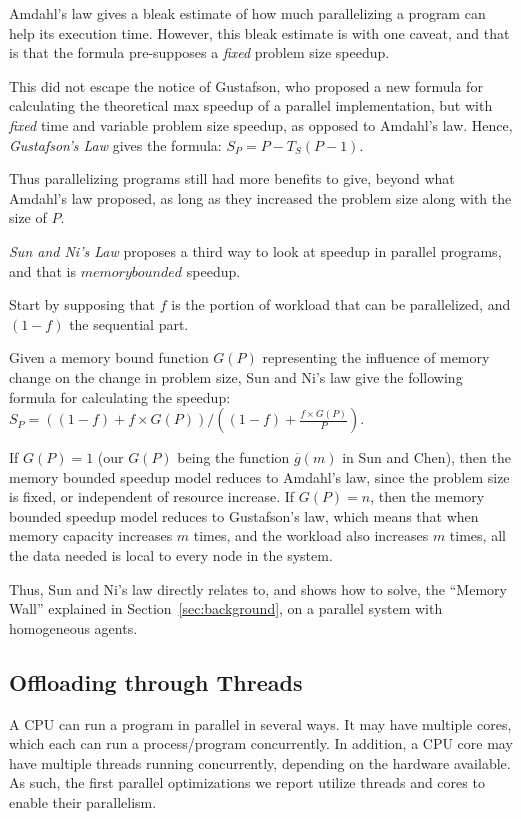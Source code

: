 Amdahl's law gives a bleak estimate of how much parallelizing a program can help its execution time.
However, this bleak estimate is with one caveat, and that is that the formula pre-supposes a \textit{fixed} problem size speedup.

This did not escape the notice of Gustafson\cite{Gustafson:1988:RAL:42411.42415}, who proposed a new formula for calculating the theoretical max speedup of a parallel implementation, but with \textit{fixed} time and variable problem size speedup, as opposed to Amdahl's law.
Hence, \textit{Gustafson's Law} gives the formula: $S_P = P - T_S(P-1)$.

Thus parallelizing programs still had more benefits to give, beyond what Amdahl's law proposed, as long as they increased the problem size along with the size of $P$.

\textit{Sun and Ni's Law}\cite{Sun:1990:VPS:110382.110450,Sun2010183} proposes a third way to look at speedup in parallel programs, and that is $memory bounded$ speedup.

Start by supposing that $f$ is the portion of workload that can be parallelized, and $(1-f)$ the sequential part.

Given a memory bound function $G(P)$ representing the influence of memory change on the change in problem size, Sun and Ni's law give the following formula for calculating the speedup: $S_P = ((1-f)+f\times G(P))/((1-f)+\frac{f\times G(P)}{P})$.

If $G(P)=1$ (our $G(P)$ being the function $\overline{g}(m)$ in Sun and Chen\cite{Sun2010183}), then the memory bounded speedup model reduces to Amdahl's law, since the problem size is fixed, or independent of resource increase.
If $G(P)=n$, then the memory bounded speedup model reduces to Gustafson's law, which means that when memory capacity increases $m$ times, and the workload also increases $m$ times, all the data needed is local to every node in the system.

Thus, Sun and Ni's law directly relates to, and shows how to solve, the ``Memory Wall'' explained in Section~\ref{sec:background}, on a parallel system with homogeneous agents.

\subsection{Offloading through Threads}

A CPU can run a program in parallel in several ways.
It may have multiple cores, which each can run a process/program concurrently.
In addition, a CPU core may have multiple threads running concurrently, depending on the hardware available.
As such, the first parallel optimizations we report utilize threads and cores to enable their parallelism.

